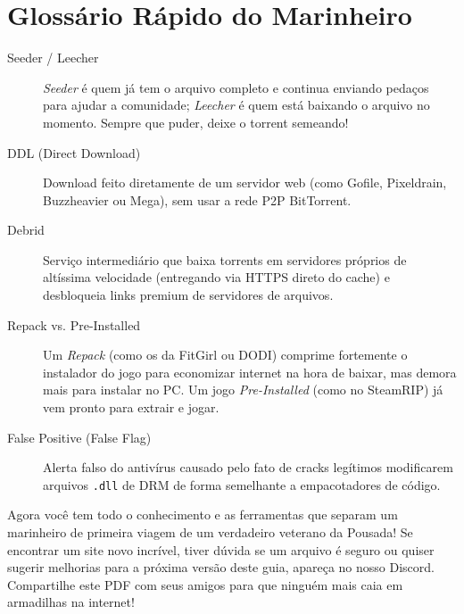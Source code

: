 \documentclass{pousadaguide}
\begin{document}
\section{Glossário Rápido do Marinheiro}

\begin{description}
  \item[Seeder / Leecher] \emph{Seeder} é quem já tem o arquivo completo e continua enviando pedaços para ajudar a comunidade; \emph{Leecher} é quem está baixando o arquivo no momento. Sempre que puder, deixe o torrent semeando!
  \item[DDL (Direct Download)] Download feito diretamente de um servidor web (como Gofile, Pixeldrain, Buzzheavier ou Mega), sem usar a rede P2P BitTorrent.
  \item[Debrid] Serviço intermediário que baixa torrents em servidores próprios de altíssima velocidade (entregando via HTTPS direto do cache) e desbloqueia links premium de servidores de arquivos.
  \item[Repack vs. Pre-Installed] Um \emph{Repack} (como os da FitGirl ou DODI) comprime fortemente o instalador do jogo para economizar internet na hora de baixar, mas demora mais para instalar no PC. Um jogo \emph{Pre-Installed} (como no SteamRIP) já vem pronto para extrair e jogar.
  \item[False Positive (False Flag)] Alerta falso do antivírus causado pelo fato de cracks legítimos modificarem arquivos \texttt{.dll} de DRM de forma semelhante a empacotadores de código.
\end{description}

\divisor

\begin{pousadinha}
Agora você tem todo o conhecimento e as ferramentas que separam um marinheiro de primeira viagem de um verdadeiro veterano da Pousada! Se encontrar um site novo incrível, tiver dúvida se um arquivo é seguro ou quiser sugerir melhorias para a próxima versão deste guia, apareça no nosso Discord. Compartilhe este PDF com seus amigos para que ninguém mais caia em armadilhas na internet!
\end{pousadinha}

\contracapa
\end{document}
